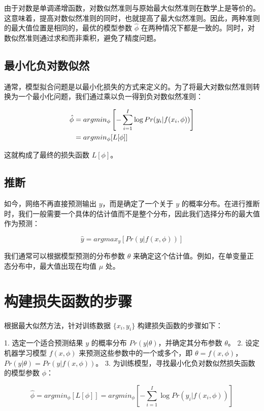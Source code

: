 由于对数是单调递增函数，对数似然准则与原始最大似然准则在数学上是等价的。这意味着，提高对数似然准则的同时，也就提高了最大似然准则。因此，两种准则的最大值位置是相同的，最优的模型参数 \(\hat{\phi}\) 在两种情况下都是一致的。同时，对数似然准则通过求和而非乘积，避免了精度问题。
\subsection{最小化负对数似然}

通常，模型拟合问题是以最小化损失的方式来定义的。为了将最大对数似然准则转换为一个最小化问题，我们通过乘以负一得到负对数似然准则：


\begin{align}
	\hat{\phi} &= argmin_{\phi} \left[ - \sum_{i=1}^{I} \log Pr(y_i|f(x_i, \phi)) \right] \notag \\
	&= argmin_{\phi} [ L[\phi] ] 
\end{align}

这就构成了最终的损失函数 \(L[\phi]\)。

\subsection{推断}

如今，网络不再直接预测输出 \(y\)，而是确定了一个关于 \(y\) 的概率分布。在进行推断时，我们一般需要一个具体的估计值而不是整个分布，因此我们选择分布的最大值作为预测：

\begin{equation}
	\hat{y} = argmax_y [Pr(y|f(x, \phi))]  
\end{equation}


我们通常可以根据模型预测的分布参数 \(\theta\) 来确定这个估计值。例如，在单变量正态分布中，最大值出现在均值 \(\mu\) 处。


\section{构建损失函数的步骤}

根据最大似然方法，针对训练数据 \(\{x_i, y_i\}\) 构建损失函数的步骤如下：

1. 选定一个适合预测结果 \(y\) 的概率分布 \(Pr(y|\theta)\)，并确定其分布参数 \(\theta\)。
2. 设定机器学习模型 \(f(x, \phi)\) 来预测这些参数中的一个或多个，即 \(\theta = f(x, \phi)\)，\(Pr(y|\theta) = Pr(y|f(x, \phi))\)。
3. 为训练模型，寻找最小化负对数似然损失函数的模型参数 \(\phi\)：

\begin{equation}
	\hat{\phi} = argmin_{\phi} [ L[\phi] ] = argmin_{\phi} \left[ - \sum_{i=1}^{I} \log Pr(y_i|f(x_i, \phi)) \right] 
\end{equation}


